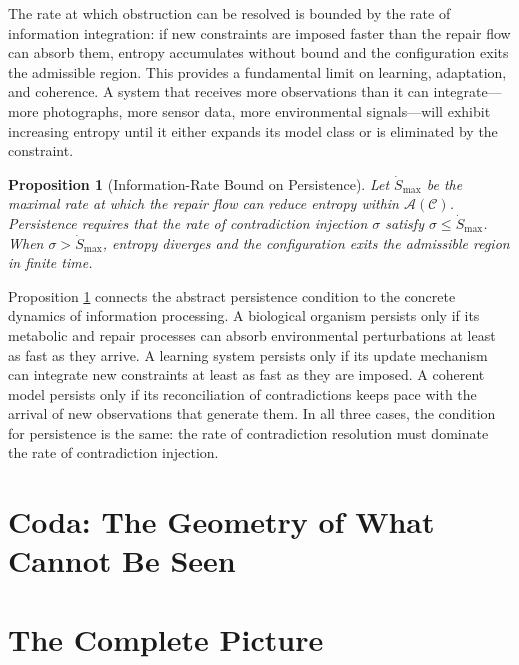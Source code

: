 \documentclass[12pt, a4paper, oneside]{article}
\theoremstyle{plain}
\newtheorem{proposition}[theorem]{Proposition}
\theoremstyle{definition}
\theoremstyle{remark}
\newcommand{\C}{\mathcal{C}}
\newcommand{\A}{\mathcal{A}}
\begin{document}
The rate at which obstruction can be resolved is bounded by the rate of information integration: if new constraints are imposed faster than the repair flow can absorb them, entropy accumulates without bound and the configuration exits the admissible region. This provides a fundamental limit on learning, adaptation, and coherence. A system that receives more observations than it can integrate---more photographs, more sensor data, more environmental signals---will exhibit increasing entropy until it either expands its model class or is eliminated by the constraint.

\begin{proposition}[Information-Rate Bound on Persistence]
\label{prop:info-rate}
Let $\dot{S}_{\mathrm{max}}$ be the maximal rate at which the repair flow can reduce entropy within $\A(\C)$. Persistence requires that the rate of contradiction injection $\sigma$ satisfy $\sigma \leq \dot{S}_{\mathrm{max}}$. When $\sigma > \dot{S}_{\mathrm{max}}$, entropy diverges and the configuration exits the admissible region in finite time.
\end{proposition}

Proposition \ref{prop:info-rate} connects the abstract persistence condition to the concrete dynamics of information processing. A biological organism persists only if its metabolic and repair processes can absorb environmental perturbations at least as fast as they arrive. A learning system persists only if its update mechanism can integrate new constraints at least as fast as they are imposed. A coherent model persists only if its reconciliation of contradictions keeps pace with the arrival of new observations that generate them. In all three cases, the condition for persistence is the same: the rate of contradiction resolution must dominate the rate of contradiction injection.

\section*{Coda: The Geometry of What Cannot Be Seen}

\setcounter{section}{56}

\section{The Complete Picture}
\end{document}
